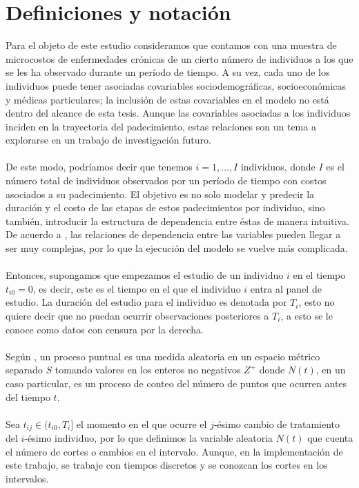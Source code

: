 \section{Definiciones y notaci\'on}
Para el objeto de este estudio consideramos que contamos con una muestra de microcostos de enfermedades cr\'onicas de un cierto n\'umero de individuos a los que se les ha observado durante un per\'iodo de tiempo. A su vez, cada uno de los individuos puede tener asociadas covariables sociodemogr\'aficas, socioecon\'omicas y m\'edicas particulares; la inclusi\'on de estas covariables en el modelo no est\'a dentro del alcance de esta tesis. Aunque las covariables asociadas a los individuos inciden en la trayectoria del padecimiento, estas relaciones son un tema a explorarse en un trabajo de investigaci\'on futuro.\\
\\
De este modo, podr\'iamos decir que tenemos $i=1,...,I$ individuos, donde $I$ es el n\'umero total de individuos observados por un per\'iodo de tiempo con costos asociados a su padecimiento. El objetivo es no solo modelar y predecir la duraci\'on y el costo de las etapas de estos padecimientos por individuo, sino tambi\'en, introducir la estructura de dependencia entre \'estas de manera intuitiva. De acuerdo a \cite{daley2003}, las relaciones de dependencia entre las variables pueden llegar a ser muy complejas, por lo que la ejecuci\'on del modelo se vuelve m\'as complicada.\\ 
\\
Entonces, supongamos que empezamos el estudio de un individuo $i$ en el tiempo $t_{i0}=0$, es decir, este es el tiempo en el que el individuo $i$ entra al panel de estudio. La duraci\'on del estudio para el individuo es denotada por $T_i$, esto no quiere decir que no puedan ocurrir observaciones posteriores a $T_i$, a esto se le conoce como datos con censura por la derecha.\\
\\
Seg\'un \cite{intropp}, un proceso puntual es una medida aleatoria en un espacio m\'etrico separado $S$ tomando valores en los enteros no negativos $Z^+$ donde $N(t)$, en un caso particular, es un proceso de conteo del n\'umero de puntos que ocurren antes del tiempo $t$.\\
\\
Sea $t_{ij} \in (t_{i0},T_i]$ el momento en el que ocurre el $j$-\'esimo cambio de tratamiento del $i$-\'esimo individuo, por lo que definimos la variable aleatoria $N(t)$ que cuenta el n\'umero de cortes o cambios en el intervalo. Aunque, en la implementaci\'on de este trabajo, se trabaje con tiempos discretos y se conozcan los cortes en los intervalos.\\
